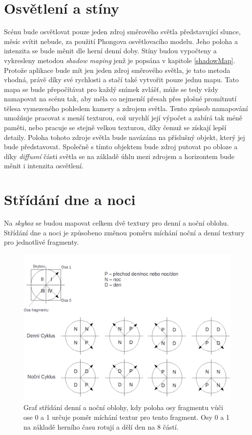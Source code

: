 \section{Osvětlení a stíny}
Scénu bude osvětlovat pouze jeden zdroj směrového světla představující slunce, měsíc svítit nebude, za použití Phongova osvětlovacího modelu. Jeho poloha a intenzita se bude měnit dle herní denní doby.   
Stíny budou vypočteny a vykresleny metodou \emph{shadow maping }jenž je popsána v kapitole \ref{shadowMap}. Protože aplikace bude mít jen jeden  zdroj směrového světla, je tato metoda vhodná, právě díky své rychlosti a stačí také vytvořit pouze jednu mapu. Tato mapa se bude přepočítávat pro každý snímek zvlášť, může se tedy vždy namapovat na scénu tak, aby měla co nejmenší přesah přes plošné promítnutí tělesa vymezeného pohledem kamery a zdrojem světla. Tento způsob namapování umožňuje pracovat s menší texturou, což urychlí její výpočet a zabírá tak méně paměti, nebo pracuje se stejně velkou texturou, díky čemuž se získají lepší detaily. Poloha tohoto zdroje světla bude navázána na příslušný objekt, který jej bude představovat. Společně s tímto objektem bude zdroj putovat po obloze a díky \emph{diffusní} části světla se na základě úhlu mezi zdrojem a horizontem bude měnit i intenzita osvětlení. 
\section{Střídání dne a noci}\label{dayNight}
Na \emph{skybox} se budou mapovat celkem dvě textury pro denní a noční oblohu. Střídání dne a noci je způsobeno změnou poměru míchání noční a denní textury pro jednotlivé fragmenty.

    \begin{figure}
    	\begin{center}
    		\includegraphics[scale=0.35]{obrazky-figures/dayOnight}
    		\caption{Graf střídání denní a noční oblohy, kdy poloha osy fragmentu vůči ose 0 a 1 určuje poměr míchání textur pro tento fragment. Osy 0 a 1 na základě herního času rotují a dělí den na 8 částí. }\label{dayOnight}
    \end{center}\end{figure}

